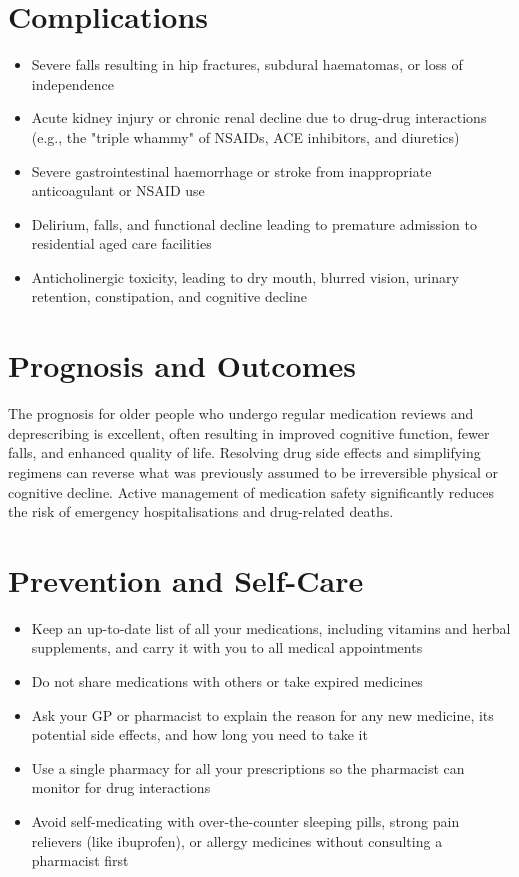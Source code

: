 \section*{Complications}
\begin{itemize}
    \item Severe falls resulting in hip fractures, subdural haematomas, or loss of independence
    \item Acute kidney injury or chronic renal decline due to drug-drug interactions (e.g., the "triple whammy" of NSAIDs, ACE inhibitors, and diuretics)
    \item Severe gastrointestinal haemorrhage or stroke from inappropriate anticoagulant or NSAID use
    \item Delirium, falls, and functional decline leading to premature admission to residential aged care facilities
    \item Anticholinergic toxicity, leading to dry mouth, blurred vision, urinary retention, constipation, and cognitive decline
\end{itemize}

\section*{Prognosis and Outcomes}
The prognosis for older people who undergo regular medication reviews and deprescribing is excellent, often resulting in improved cognitive function, fewer falls, and enhanced quality of life. Resolving drug side effects and simplifying regimens can reverse what was previously assumed to be irreversible physical or cognitive decline. Active management of medication safety significantly reduces the risk of emergency hospitalisations and drug-related deaths.

\section*{Prevention and Self-Care}
\begin{itemize}
    \item Keep an up-to-date list of all your medications, including vitamins and herbal supplements, and carry it with you to all medical appointments
    \item Do not share medications with others or take expired medicines
    \item Ask your GP or pharmacist to explain the reason for any new medicine, its potential side effects, and how long you need to take it
    \item Use a single pharmacy for all your prescriptions so the pharmacist can monitor for drug interactions
    \item Avoid self-medicating with over-the-counter sleeping pills, strong pain relievers (like ibuprofen), or allergy medicines without consulting a pharmacist first
\end{itemize}

